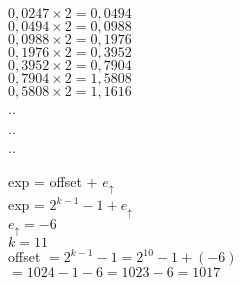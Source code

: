 \documentclass[12pt]{article}
\begin{document}
\begin{figure}[H]
    \begin{minipage}{0.25\textwidth}
        \vspace{0.6cm}
        $0,0247\times 2 = 0,0494$\\
        $0,0494\times 2 = 0,0988$\\
        $0,0988\times 2 = 0,1976$\\
        $0,1976\times 2 = 0,3952$\\
        $0,3952\times 2 = 0,7904$\\
        $0,7904\times 2 = 1,5808$\\
        $0,5808\times 2 = 1,1616$\\
        .\hspace{3cm}.\\
        .\hspace{3cm}.\\
        .\hspace{3cm}.\\
    \end{minipage}
    \hspace{0.2cm}
    \begin{minipage}{0.2\textwidth}
    \end{minipage}
    \hfill
    \begin{minipage}{0.5\textwidth}
        \vspace{-0.5cm}
        exp = offset + $e_{\uparrow}$ \\
        exp = $ 2^{k-1}-1+e_{\uparrow} $\\
        $e_{\uparrow}=-6 $\\
        $k=11$ \\
        offset $= 2^{k-1}-1=2^{10}-1+(-6) $\\
        $= 1024 -1-6=1023-6=1017 $\\
    \end{minipage}
\end{figure}
\end{document}
